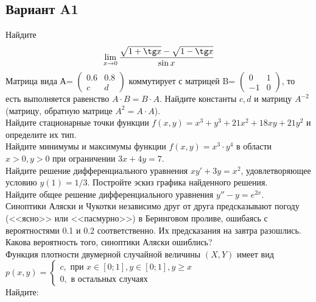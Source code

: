 \documentclass[addpoints, answers]{exam} %
\begin{document}
\subsection{Вариант A1}
\begin{questions}
\question Найдите
\[
\lim_{x\to 0}\frac{\sqrt{1+\tg x}-\sqrt{1-\tg x}}{\sin x}
\]
\question Матрица вида А=
$\left( \begin{array}{cc}
0.6 & 0.8\\
c & d
\end{array} \right)$
коммутирует с матрицей B=
$\left( \begin{array}{cc}
0 & 1\\
-1 & 0
\end{array} \right)$, то есть выполняется равенство $A\cdot B=B\cdot A$. Найдите константы $c,d$ и матрицу $A^{-2}$ (матрицу, обратную матрице $A^2=A\cdot A$).\\

\question Найдите стационарные точки функции $f(x,y)=x^3+y^3+21x^2+18xy+21y^2$ и определите их тип.\\
\question Найдите минимумы и максимумы функции $f(x,y)=x^3\cdot y^4$ в области $x>0,y>0$ при ограничении $3x+4y=7$.\\
\question Найдите решение дифференциального уравнения $xy'+3y=x^2$, удовлетворяющее условию $y(1)=1/3$. Постройте эскиз графика найденного решения. \\
\question Найдите общее решение дифференциального уравнения $y''-y=e^{2x}$.\\
\question Синоптики Аляски и Чукотки независимо друг от друга предсказывают погоду (<<ясно>> или <<пасмурно>>) в Беринговом проливе, ошибаясь с вероятностями 0.1 и 0.2 соответственно. Их предсказания на завтра разошлись. Какова вероятность того, синоптики Аляски ошиблись?\\
\question Функция плотности двумерной случайной величины $(X,Y)$ имеет вид\\
$p(x,y)=\begin{cases}
c,\text{ при } x\in [0;1],y \in [0;1], y\geq x\\
0,\text{ в остальных случаях }
\end{cases}$\\
Найдите:
\end{questions}
\end{document}

